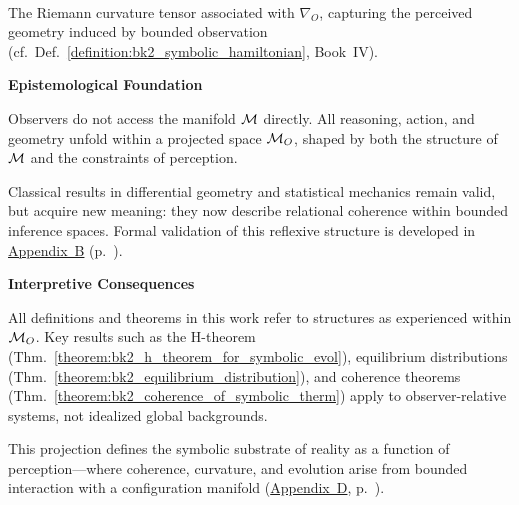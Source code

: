 \begin{tcolorbox}
\begin{description}[leftmargin=0pt, itemsep=6pt]
    \item[\textbf{Observer-Relative Curvature \(\kappa_O\)}] \hfill \\
    The Riemann curvature tensor associated with \(\nabla_O\), capturing the perceived geometry induced by bounded observation (cf.~Def.~\ref{definition:bk2_symbolic_hamiltonian}, Book~IV).
\end{description}

\medskip
\noindent\textbf{Epistemological Foundation}

Observers do not access the manifold \(\mathcal{M}\) directly. All reasoning, action, and geometry unfold within a projected space \(\mathcal{M}_O\), shaped by both the structure of \(\mathcal{M}\) and the constraints of perception.

Classical results in differential geometry and statistical mechanics remain valid, but acquire new meaning: they now describe relational coherence within bounded inference spaces.
Formal validation of this reflexive structure is developed in \hyperref[sec:appB_overview]{Appendix~B} (p.~\pageref{sec:appB_overview}).

\medskip
\noindent\textbf{Interpretive Consequences}

All definitions and theorems in this work refer to structures as experienced within \(\mathcal{M}_O\). Key results such as the H-theorem (Thm.~\ref{theorem:bk2_h_theorem_for_symbolic_evol}), equilibrium distributions (Thm.~\ref{theorem:bk2_equilibrium_distribution}), and coherence theorems (Thm.~\ref{theorem:bk2_coherence_of_symbolic_therm}) apply to observer-relative systems, not idealized global backgrounds.

This projection defines the symbolic substrate of reality as a function of perception---where coherence, curvature, and evolution arise from bounded interaction with a configuration manifold (\hyperref[sec:appD_preamble_nature_of_appendix]{Appendix~D}, p.~\pageref{sec:appD_preamble_nature_of_appendix}).

\end{tcolorbox}
